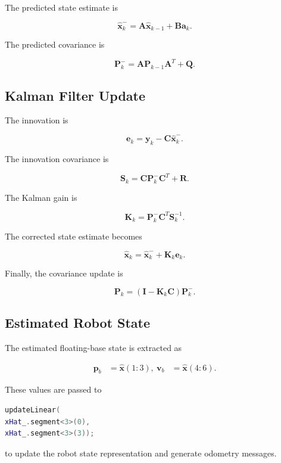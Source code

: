 The predicted state estimate is

\begin{equation}
\hat{\mathbf{x}}^{-}_k
=
\mathbf{A}\hat{\mathbf{x}}_{k-1}
+
\mathbf{B}\mathbf{a}_k.
\end{equation}

The predicted covariance is

\begin{equation}
\mathbf{P}^{-}_k
=
\mathbf{A}
\mathbf{P}_{k-1}
\mathbf{A}^{T}
+
\mathbf{Q}.
\end{equation}

\subsection{Kalman Filter Update}

The innovation is

\begin{equation}
\mathbf{e}_k
=
\mathbf{y}_k
-
\mathbf{C}
\hat{\mathbf{x}}^{-}_k.
\end{equation}

The innovation covariance is

\begin{equation}
\mathbf{S}_k
=
\mathbf{C}
\mathbf{P}^{-}_k
\mathbf{C}^{T}
+
\mathbf{R}.
\end{equation}

The Kalman gain is

\begin{equation}
\mathbf{K}_k
=
\mathbf{P}^{-}_k
\mathbf{C}^{T}
\mathbf{S}_k^{-1}.
\end{equation}

The corrected state estimate becomes

\begin{equation}
\hat{\mathbf{x}}_k
=
\hat{\mathbf{x}}^{-}_k
+
\mathbf{K}_k
\mathbf{e}_k.
\end{equation}

Finally, the covariance update is

\begin{equation}
\mathbf{P}_k
=
\left(
\mathbf{I}
-\mathbf{K}_k
\mathbf{C}
\right)
\mathbf{P}^{-}_k.
\end{equation}

\subsection{Estimated Robot State}

The estimated floating-base state is extracted as

\begin{align}
\mathbf{p}_b
&=
\hat{\mathbf{x}}(1:3),
\
\mathbf{v}_b
&=
\hat{\mathbf{x}}(4:6).
\end{align}

These values are passed to

\begin{lstlisting}[language=C++]
updateLinear(
xHat_.segment<3>(0),
xHat_.segment<3>(3));
\end{lstlisting}

to update the robot state representation and generate odometry messages.
